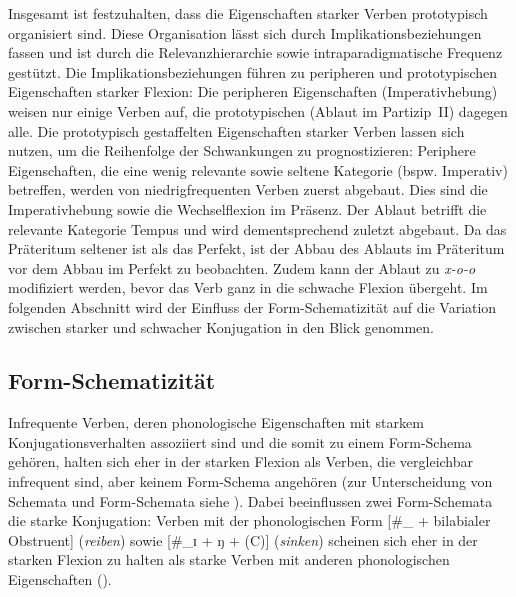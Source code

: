 \begin{sloppypar}
Insgesamt ist festzuhalten, dass die Eigenschaften starker Verben prototypisch organisiert sind. Diese Organisation lässt sich durch Implikationsbeziehungen fassen und ist durch die Relevanzhierarchie sowie intraparadigmatische Frequenz gestützt. Die Implikationsbeziehungen führen zu peripheren und prototypischen Eigenschaften starker Flexion: Die peripheren Eigenschaften (Imperativhebung) weisen nur einige Verben auf, die prototypischen (Ablaut im Partizip~II) dagegen alle. Die prototypisch gestaffelten Eigenschaften starker Verben lassen sich nutzen, um die Reihenfolge der Schwankungen zu prognostizieren: Periphere Eigenschaften, die eine wenig relevante sowie seltene Kategorie (bspw. Imperativ) betreffen, werden von niedrigfrequenten Verben zuerst abgebaut. Dies sind die Imperativhebung sowie die Wechselflexion im Präsenz. Der Ablaut betrifft die relevante Kategorie Tempus und wird dementsprechend zuletzt abgebaut. Da das Prä\-teri\-tum seltener ist als das Perfekt, ist der Abbau des Ablauts im Präteritum vor dem Abbau im Perfekt zu beobachten. Zudem kann der Ablaut zu \textit{x-o-o} modifiziert werden, bevor das Verb ganz in die schwache Flexion übergeht. Im folgenden Abschnitt wird der Einfluss der Form-Schematizität auf die Variation zwischen starker und schwacher Konjugation in den Blick genommen.  
\end{sloppypar}

\subsection{Form-Schematizität}
\label{schemaverb}

Infrequente Verben, deren phonologische Eigenschaften mit starkem Konjugationsverhalten assoziiert sind und die somit zu einem Form-Schema gehören, halten sich eher in der starken Flexion als Verben, die vergleichbar infrequent sind, aber keinem Form-Schema angehören (zur Unterscheidung von Schemata und Form-Schemata siehe ). Dabei beeinflussen zwei Form-Schemata die starke Konjugation: Verben mit der phonologischen Form [\#\_{} + bilabialer Ob\-stru\-ent] (\textit{reiben}) sowie [\#\_ɪ + ŋ + (C)] (\textit{sinken}) scheinen sich eher in der starken Flexion zu halten als starke Verben mit anderen phonologischen Eigenschaften (\cite[52--27]{Kopcke.1999}).



